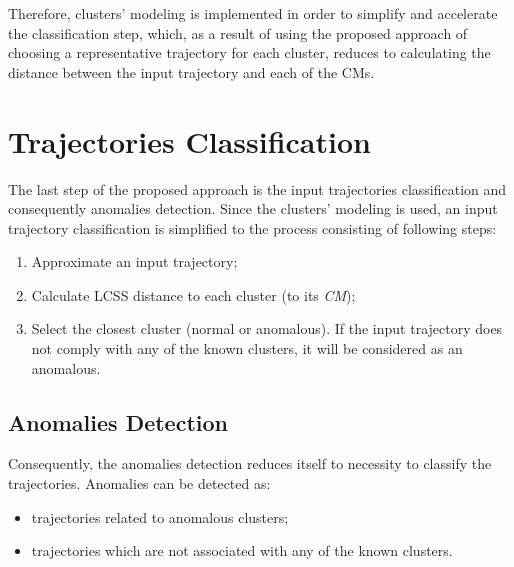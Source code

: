 Therefore, clusters' modeling is implemented in order to simplify and accelerate the classification step, which, as a result of using the proposed approach of choosing a representative trajectory for each cluster, reduces to calculating the distance between the input trajectory and each of the CMs.

\section{Trajectories Classification}

The last step of the proposed approach is the input trajectories classification and consequently anomalies detection. Since the clusters' modeling is used, an input trajectory classification is simplified to the process consisting of following steps:

\begin{enumerate}
	\setlength\itemsep{0em}	
	\item Approximate an input trajectory;
	\item Calculate LCSS distance to each cluster (to its \textit{CM});
	\item Select the closest cluster (normal or anomalous). If the input trajectory does not comply with any of the known clusters, it will be considered as an anomalous.
\end{enumerate}

\subsection{Anomalies Detection}

Consequently, the anomalies detection reduces itself to necessity to classify the trajectories. Anomalies can be detected as:

\begin{itemize}
	\setlength\itemsep{0em}
	\item trajectories related to anomalous clusters;
	\item trajectories which are not associated with any of the known clusters.
\end{itemize}




